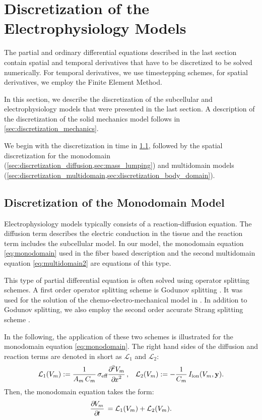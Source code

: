 \section{Discretization of the Electrophysiology Models}\label{sec:discretization}

The partial and ordinary differential equations described in the last section contain spatial and temporal derivatives that have to be discretized to be solved numerically. For temporal derivatives, we use timestepping schemes, for spatial derivatives, we employ the Finite Element Method.

In this section, we describe the discretization of the subcellular and electrophysiology models that were presented in the last section. A description of the discretization of the solid mechanics model follows in \cref{sec:discretization_mechanics}.

We begin with the discretization in time in \cref{sec:discretization_monodomain}, followed by the spatial discretization for the monodomain (\cref{sec:discretization_diffusion,sec:mass_lumping}) and multidomain models (\cref{sec:discretization_multidomain,sec:discretization_body_domain}).

\subsection{Discretization of the Monodomain Model}\label{sec:discretization_monodomain}

Electrophysiology models typically consists of a reaction-diffusion equation. The diffusion term describes the electric conduction in the tissue and the reaction term includes the subcellular model. In our model, the monodomain equation  \cref{eq:monodomain} used in the fiber based description and the second multidomain equation \cref{eq:multidomain2} are equations of this type.

This type of partial differential equation is often solved using operator splitting schemes. A first order operator splitting scheme is Godunov splitting \cite{Godunov2003}. It was used for the solution of the chemo-electro-mechanical model in \cite{Roehrle2012}. In addition to Godunov splitting, we also employ the second order accurate Strang splitting scheme \cite{Strang1968}.

In the following, the application of these two schemes is illustrated for the monodomain equation \cref{eq:monodomain}. The right hand sides of the diffusion and reaction terms are denoted in short as $\mathcal{L}_1$ and $\mathcal{L}_2$:%
\begin{align*}
  \mathcal{L}_1(V_m) := \dfrac{1}{A_m\,C_m} \sigma_\text{eff}\dfrac{\partial^2 V_m}{\partial x^2}, &&
  \mathcal{L}_2(V_m) := -\dfrac{1}{C_m} I_\text{ion}(V_m,\bfy).
\end{align*}
%
Then, the monodomain equation takes the form:
%
\begin{align}\label{eq:monodomain_operator_splitting}
  \p{V_m}{t} = \mathcal{L}_1(V_m) + \mathcal{L}_2(V_m).
\end{align}

